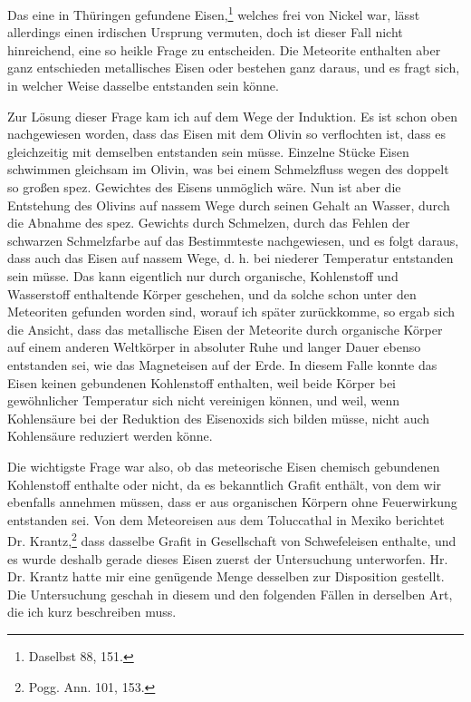 \documentclass[a4paper, 11pt, oneside, german]{article}
\begin{document}
Das eine in Thüringen gefundene Eisen,\footnote{Daselbst 88, 151.} welches frei von Nickel war, lässt allerdings einen irdischen Ursprung vermuten, doch ist dieser Fall nicht hinreichend, eine so heikle Frage zu entscheiden. Die Meteorite enthalten aber ganz entschieden metallisches Eisen oder bestehen ganz daraus, und es fragt sich, in welcher Weise dasselbe entstanden sein könne.

Zur Lösung dieser Frage kam ich auf dem Wege der Induktion. Es ist schon oben nachgewiesen worden, dass das Eisen mit dem Olivin so verflochten ist, dass es gleichzeitig mit demselben entstanden sein müsse. Einzelne Stücke Eisen schwimmen gleichsam im Olivin, was bei einem Schmelzfluss wegen des doppelt so großen spez. Gewichtes des Eisens unmöglich wäre. Nun ist aber die Entstehung des Olivins auf nassem Wege durch seinen Gehalt an Wasser, durch die Abnahme des spez. Gewichts durch Schmelzen, durch das Fehlen der schwarzen Schmelzfarbe auf das Bestimmteste nachgewiesen, und es folgt daraus, dass auch das Eisen auf nassem Wege, d. h. bei niederer Temperatur entstanden sein müsse. Das kann eigentlich nur durch organische, Kohlenstoff und Wasserstoff enthaltende Körper geschehen, und da solche schon unter den Meteoriten gefunden worden sind, worauf ich später zurückkomme, so ergab sich die Ansicht, dass das metallische Eisen der Meteorite durch organische Körper auf einem anderen Weltkörper in absoluter Ruhe und langer Dauer ebenso entstanden sei, wie das Magneteisen auf der Erde. In diesem Falle konnte das Eisen keinen gebundenen Kohlenstoff enthalten, weil beide Körper bei gewöhnlicher Temperatur sich nicht vereinigen können, und weil, wenn Kohlensäure bei der Reduktion des Eisenoxids sich bilden müsse, nicht auch Kohlensäure reduziert werden könne.

Die wichtigste Frage war also, ob das meteorische Eisen chemisch gebundenen Kohlenstoff enthalte oder nicht, da es bekanntlich Grafit enthält, von dem wir ebenfalls annehmen müssen, dass er aus organischen Körpern ohne Feuerwirkung entstanden sei. Von dem Meteoreisen aus dem Toluccathal in Mexiko berichtet Dr. Krantz,\footnote{Pogg. Ann. 101, 153.} dass dasselbe Grafit in Gesellschaft von Schwefeleisen enthalte, und es wurde deshalb gerade dieses Eisen zuerst der Untersuchung unterworfen. Hr. Dr. Krantz hatte mir eine genügende Menge desselben zur Disposition gestellt. Die Untersuchung geschah in diesem und den folgenden Fällen in derselben Art, die ich kurz beschreiben muss.
\end{document}
